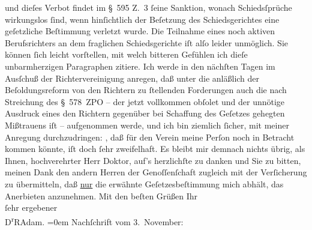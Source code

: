 \begin{ledgroupsized}[t]{13cm}
                    und dieſes Verbot findet im § 595 Z. 3 ſeine Sanktion, wonach Schiedsſprüche
                        wirkungs{\pb}los ſind, wenn
                    hinſichtlich der Beſetzung des Schiedsgerichtes eine geſetzliche Beſtimmung
                    verletzt wurde. Die Teilnahme eines noch aktiven Berufsrichters an dem
                    fraglichen Schiedsgerichte iſt alſo leider unmöglich.\pend
           \pstart
           Sie können ſich leicht vorſtellen, mit welch bitteren Gefühlen ich dieſe
                    unbarmherzigen Paragraphen zitiere.\pend
           \pstart
           Ich werde in den nächſten Tagen im Ausſchuß der Richtervereinigung anregen, daß unter die anläßlich der
                    Beſoldungsreform von den Richtern zu ſtellenden Forderungen auch die nach
                    Streichung des § 578 ZPO – der jetzt vollkommen obſolet und der unnötige
                    Ausdruck eines den Richtern gegenüber bei Schaffung des Geſetzes gehegten
                    Mißtrauens iſt – aufgenommen werde, und ich bin ziemlich ſicher, mit meiner
                    Anregung durchzudringen: \label{K_L02357_1v}\label{K_L02357_1h}, daß für den Verein meine Perſon noch in Betracht kommen könnte,
                    iſt doch ſehr zweifelhaft.\pend
           \pstart
           {\pb}Es bleibt mir demnach nichts übrig,
                    als Ihnen, hochverehrter Herr Doktor, auf’s herzlichſte zu danken und Sie zu
                    bitten, meinen Dank den andern Herren der Genoſſenſchaft zugleich mit der Verſicherung zu
                    übermitteln, daß \uline{nur} die erwähnte
                    Geſetzesbeſtimmung mich abhält, das Anerbieten anzunehmen.\pend
           \pstart
           Mit den beſten Grüßen Ihr{\\[\baselineskip]}ſehr ergebener{\\[\baselineskip]}\spacefill\mbox{D\textsuperscript{r}RAdam.}\pend
           \leftskip=0em{}\pstart
           \noindent{}Nachſchrift vom 3. November:\pend

\end{ledgroupsized}
